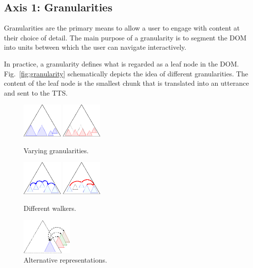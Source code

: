 \documentclass{sig-alternate}
\begin{document}
\subsection{Axis 1: Granularities}
\label{sec:ax1}

Granularities are the primary means to allow a user to engage with content at
their choice of detail. The main purpose of a granularity is to segment the DOM
into units between which the user can navigate interactively.

In practice, a granularity defines what is regarded as a leaf node in the
DOM. Fig.~\ref{fig:granularity} schematically depicts the idea of different
granularities. The content of the leaf node is the smallest chunk that is
translated into an utterance and sent to the TTS.

\begin{figure}[t!]
  \begin{minipage}{.33\linewidth}
    \begin{center}
      \leavevmode
      \includegraphics[width=2cm]{images/granularity1}\qquad
      \includegraphics[width=2cm]{images/granularity2}
      \caption{Varying granularities.}
      \label{fig:granularity}
    \end{center}
  \end{minipage}
  \begin{minipage}{.33\linewidth}
  \begin{center}
    \leavevmode
    \includegraphics[width=2cm]{images/walker1}\qquad
    \includegraphics[width=2cm]{images/walker2}
    \caption{Different walkers.}
    \label{fig:walkers}
  \end{center}
\end{minipage}
  \begin{minipage}{.33\linewidth}
\begin{center}
    \leavevmode
    \includegraphics[width=2.5cm]{images/substructure1}
    \caption{Alternative representations.}
    \label{fig:alt}
  \end{center}
\end{minipage}
\end{figure}
\end{document}
